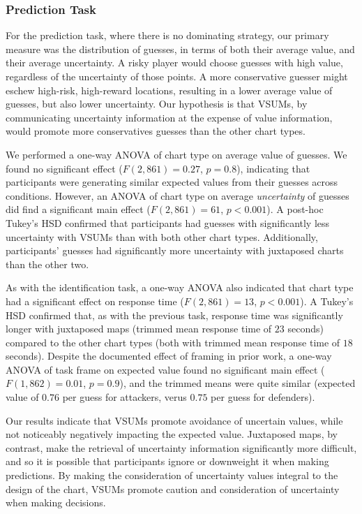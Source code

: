 \documentclass{vgtc}                          %
\begin{document}
\subsubsection{Prediction Task}

For the prediction task, where there is no dominating strategy, our primary measure was the distribution of guesses, in terms of both their average value, and their average uncertainty. A risky player would choose guesses with high value, regardless of the uncertainty of those points. A more conservative guesser might eschew high-risk, high-reward locations, resulting in a lower average value of guesses, but also lower uncertainty. Our hypothesis is that VSUMs, by communicating uncertainty information at the expense of value information, would promote more conservatives guesses than the other chart types.

We performed a one-way ANOVA of chart type on average value of guesses. We found no significant effect ($F(2,861)=0.27$, $p=0.8$), indicating that participants were generating similar expected values from their guesses across conditions. However, an ANOVA of chart type on average \emph{uncertainty} of guesses did find a significant main effect ($F(2,861)=61$, $p<0.001$). A post-hoc Tukey's HSD confirmed that participants had guesses with significantly less uncertainty with VSUMs than with both other chart types. Additionally, participants' guesses had significantly more uncertainty with juxtaposed charts than the other two. 

As with the identification task, a one-way ANOVA also indicated that chart type had a significant effect on response time ($F(2,861)=13$, $p<0.001$). A Tukey's HSD confirmed that, as with the previous task, response time was significantly longer with juxtaposed maps (trimmed mean response time of $23$ seconds) compared to the other chart types (both with trimmed mean response time of $18$ seconds). Despite the documented effect of framing in prior work, a one-way ANOVA of task frame on expected value found no significant main effect ($F(1,862)=0.01$, $p=0.9$), and the trimmed means were quite similar (expected value of $0.76$ per guess for attackers, verus $0.75$ per guess for defenders).

Our results indicate that VSUMs promote avoidance of uncertain values, while not noticeably negatively impacting the expected value. Juxtaposed maps, by contrast, make the retrieval of uncertainty information significantly more difficult, and so it is possible that participants ignore or downweight it when making predictions. By making the consideration of uncertainty values integral to the design of the chart, VSUMs promote caution and consideration of uncertainty when making decisions.
\end{document}

